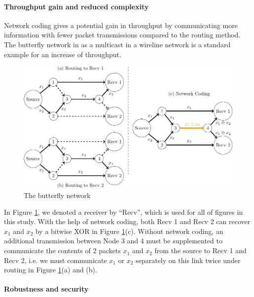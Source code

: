\paragraph{Throughput gain and reduced complexity}

Network coding gives a potential gain in throughput by communicating
more information with fewer packet transmissions compared to the routing
method. The butterfly network in \cite{Ahlswede:2000} as a multicast
in a wireline network is a standard example for an increase of throughput.
\begin{figure}[H]
\caption{The butterfly network \label{fig:The-butterfly-network}}

\centering{}\includegraphics[width=0.5\paperwidth]{./figures/ahlswede_butterfly_network}
\end{figure}
In Figure \ref{fig:The-butterfly-network}, we denoted a receiver
by ``Recv'', which is used for all of figures in this study. With
the help of network coding, both Recv 1 and Recv 2 can recover $x_{1}$
and $x_{2}$ by a bitwise XOR in Figure \ref{fig:The-butterfly-network}(c).
Without network coding, an additional transmission between Node 3
and 4 must be supplemented to communicate the contents of 2 packets
$x_{1}$ and $x_{2}$ from the source to Recv 1 and Recv 2, i.e. we
must communicate $x_{1}$ or $x_{2}$ separately on this link twice
under routing in Figure \ref{fig:The-butterfly-network}(a) and (b). 

\paragraph{Robustness and security}

